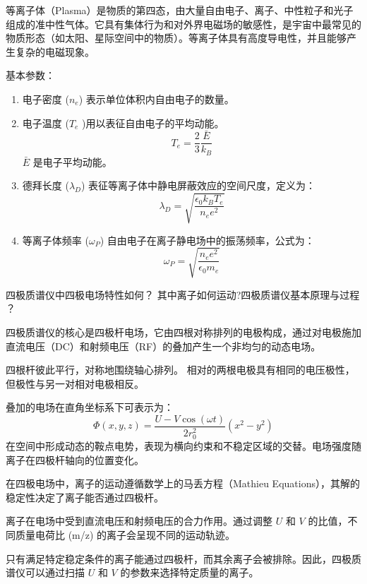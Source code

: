 \documentclass[dvipsnames, svgnames,a4paper,11pt]{article}
\begin{document}
	等离子体（Plasma）是物质的第四态，由大量自由电子、离子、中性粒子和光子组成的准中性气体。它具有集体行为和对外界电磁场的敏感性，是宇宙中最常见的物质形态（如太阳、星际空间中的物质）。等离子体具有高度导电性，并且能够产生复杂的电磁现象。
	
	基本参数：
	\begin{enumerate}
		\item 电子密度 ($n_e$) 表示单位体积内自由电子的数量。
		\item 电子温度 ($T_e$ )用以表征自由电子的平均动能。
			\[
				T_e = \frac{2}{3} \frac{ \bar{E}}{k_B}
			\]
			$\bar{E}$ 是电子平均动能。

		\item 德拜长度 ($\lambda_D$) 表征等离子体中静电屏蔽效应的空间尺度，定义为：
			\[
				\lambda_D = \sqrt{\frac{\epsilon_0 k_B T_e}{n_e e^2}}
			\]

		\item 等离子体频率 ($\omega_P$) 自由电子在离子静电场中的振荡频率，公式为：
			\[
				\omega_P = \sqrt{\frac{n_e e^2}{\epsilon_0 m_e}}
			\]


			
	\end{enumerate}


\begin{question}
	四极质谱仪中四极电场特性如何？ 其中离子如何运动?四极质谱仪基本原理与过程 ？
\end{question}

	四极质谱仪的核心是四极杆电场，它由四根对称排列的电极构成，通过对电极施加直流电压（DC）和射频电压（RF）的叠加产生一个非均匀的动态电场。

	四根杆彼此平行，对称地围绕轴心排列。
	相对的两根电极具有相同的电压极性，但极性与另一对相对电极相反。

	叠加的电场在直角坐标系下可表示为：
	\[
		\Phi(x,y,z) = \frac{U - V \cos(\omega t)}{2 r_0^2} (x^2 - y^2)
	\]
	在空间中形成动态的鞍点电势，表现为横向约束和不稳定区域的交替。电场强度随离子在四极杆轴向的位置变化。

	在四极电场中，离子的运动遵循数学上的马丢方程（Mathieu Equations），其解的稳定性决定了离子能否通过四极杆。

	离子在电场中受到直流电压和射频电压的合力作用。通过调整 $U$ 和 $V$ 的比值，不同质量电荷比 (m/z) 的离子会呈现不同的运动轨迹。


	只有满足特定稳定条件的离子能通过四极杆，而其余离子会被排除。因此，四极质谱仪可以通过扫描 $U$ 和 $V$ 的参数来选择特定质量的离子。
\end{document}
